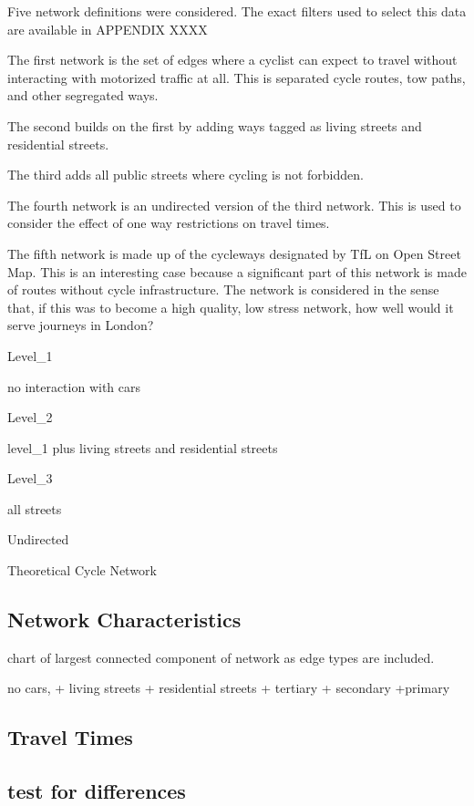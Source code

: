 \documentclass[11pt]{article} %
\begin{document}
Five network definitions were considered. The exact filters used to select this data are available in APPENDIX XXXX 

The first network is the set of edges where a cyclist can expect to travel without interacting with motorized traffic at all. This is separated cycle routes, tow paths, and other segregated ways. 

The second builds on the first by adding ways tagged as living streets and residential streets.

The third adds all public streets where cycling is not forbidden. 

The fourth network is an undirected version of the third network. This is used to consider the effect of one way restrictions on travel times. 

The fifth network is made up of the cycleways designated by TfL on Open Street Map. This is an interesting case because a significant part of this network is made of routes without cycle infrastructure. The network is considered in the sense that, if this was to become a high quality, low stress network, how well would it serve journeys in London? 

Level\_1

no interaction with cars

Level\_2

level\_1 plus living streets and residential streets

Level\_3

all streets 

Undirected

Theoretical Cycle Network

\subsection{Network Characteristics}


chart of largest connected component of network as edge types are included. 

no cars,
+ living streets
+ residential streets
+ tertiary 
+ secondary
+primary

\subsection{Travel Times}

\subsection{test for differences}
\end{document}
